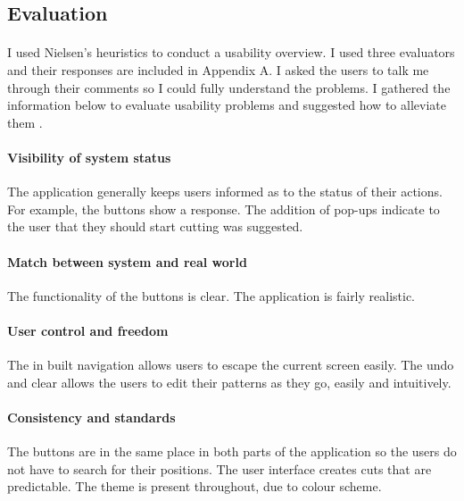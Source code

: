 \documentclass[11pt]{article}
\begin{document}
            \subsection{Evaluation}
            
                \paragraph{}
                I used Nielsen's heuristics to conduct a usability overview. I used three evaluators and their responses are included in Appendix A. I asked the users to talk me through their comments so I could fully understand the problems. I gathered the information below to evaluate usability problems and suggested how to alleviate them \cite{Neil}.

                
                \paragraph{Visibility of system status}
                The application generally keeps users informed as to the status of their actions. For example, the buttons show a response. The addition of pop-ups indicate to the user that they should start cutting was suggested. 
                
                \paragraph{Match between system and real world}
                The functionality of the buttons is clear. The application is fairly realistic.
                
                \paragraph{User control and freedom}
                The in built navigation allows users to escape the current screen easily. The undo and clear allows the users to edit their patterns as they go, easily and intuitively. 

                \paragraph{Consistency and standards}
                The buttons are in the same place in both parts of the application so the users do not have to search for their positions. The user interface creates cuts that are predictable. The theme is present throughout, due to colour scheme.
\end{document}
